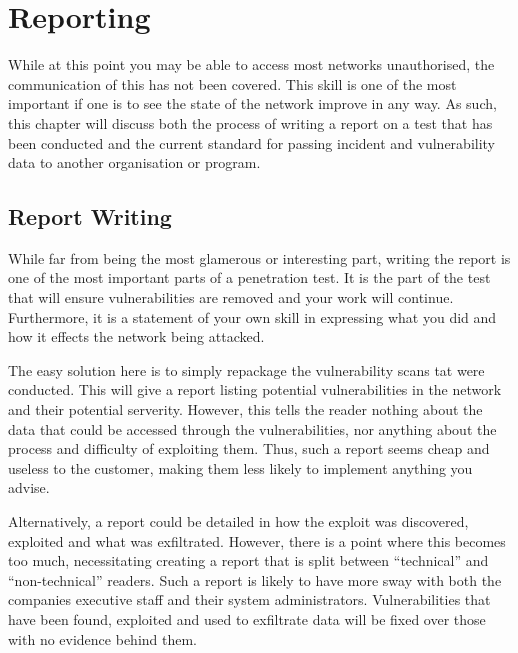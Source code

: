 \chapter{Reporting}
	\label{ch:Reporting}
	While at this point you may be able to access most networks unauthorised, the communication of this has not been covered. 
	This skill is one of the most important if one is to see the state of the network improve in any way. 
	As such, this chapter will discuss both the process of writing a report on a test that has been conducted 
	and the current standard for passing incident and vulnerability data to another organisation or program. 

	\section{Report Writing}
		While far from being the most glamerous or interesting part, writing the report is one of the most important parts of a penetration test\cite{playbook}. 
		It is the part of the test that will ensure vulnerabilities are removed and your work will continue. 
		Furthermore, it is a statement of your own skill in expressing what you did and how it effects the network being attacked.

		The easy solution here is to simply repackage the vulnerability scans tat were conducted. 
		This will give a report listing potential vulnerabilities in the network and their potential serverity. 
		However, this tells the reader nothing about the data that could be accessed through the vulnerabilities, 
		nor anything about the process and difficulty of exploiting them. 
		Thus, such a report seems cheap and useless to the customer, making them less likely to implement anything you advise. 

		Alternatively, a report could be detailed in how the exploit was discovered, exploited and what was exfiltrated. 
		However, there is a point where this becomes too much, necessitating creating a report that is split between 
		``technical'' and ``non-technical'' readers. 
		Such a report is likely to have more sway with both the companies executive staff and their system administrators. 
		Vulnerabilities that have been found, exploited and used to exfiltrate data will be fixed over those with no evidence behind them. 

